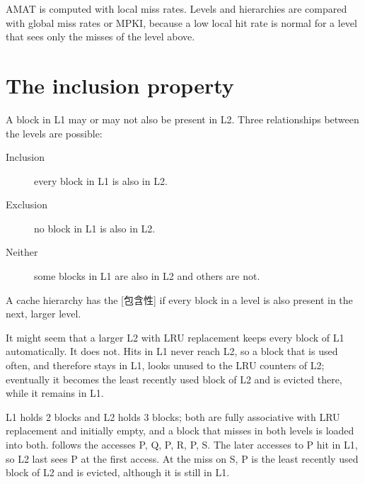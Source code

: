 \documentclass[../main.tex]{subfiles}
\begin{document}
\begin{keypoint}
  AMAT is computed with local miss rates.  Levels and hierarchies are compared
  with global miss rates or MPKI, because a low local hit rate is normal for a
  level that sees only the misses of the level above.
\end{keypoint}

\section{The inclusion property}
\label{sec:l14-inclusion}

A block in L1 may or may not also be present in L2.  Three relationships between the
levels are possible:
\begin{description}
  \item[Inclusion] every block in L1 is also in L2.
  \item[Exclusion] no block in L1 is also in L2.
  \item[Neither] some blocks in L1 are also in L2 and others are not.
\end{description}

\begin{definition}
  A cache hierarchy has the [包含性] if every block
  in a level is also present in the next, larger level.
\end{definition}

It might seem that a larger L2 with LRU replacement keeps every block of L1
automatically.  It does not.  Hits in L1 never reach L2, so a block that is
used often, and therefore stays in L1, looks unused to the LRU counters of L2;
eventually it becomes the least recently used block of L2 and is evicted
there, while it remains in L1.

\begin{example}
  \label{ex:l14-inclusion}
  L1 holds 2 blocks and L2 holds 3 blocks; both are fully associative with LRU
  replacement and initially empty, and a block that misses in both levels is
  loaded into both.   follows the accesses P, Q, P, R,
  P, S.  The later accesses to P hit in L1, so L2 last sees P at the first
  access.  At the miss on S, P is the least recently used block of L2 and is
  evicted, although it is still in L1.
\end{example}
\end{document}
